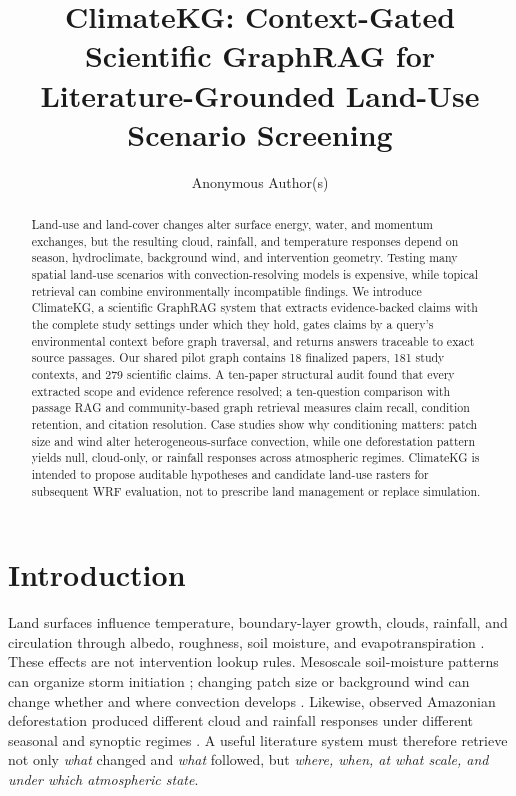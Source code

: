 \documentclass{article}
\title{ClimateKG: Context-Gated Scientific GraphRAG for\\Literature-Grounded Land-Use Scenario Screening}
\author{Anonymous Author(s)}
\newcommand{\system}{ClimateKG}
\begin{document}
\maketitle

\begin{abstract}
Land-use and land-cover changes alter surface energy, water, and momentum exchanges, but the resulting cloud, rainfall, and temperature responses depend on season, hydroclimate, background wind, and intervention geometry. Testing many spatial land-use scenarios with convection-resolving models is expensive, while topical retrieval can combine environmentally incompatible findings. We introduce \system{}, a scientific GraphRAG system that extracts evidence-backed claims with the complete study settings under which they hold, gates claims by a query's environmental context before graph traversal, and returns answers traceable to exact source passages. Our shared pilot graph contains 18 finalized papers, 181 study contexts, and 279 scientific claims. A ten-paper structural audit found that every extracted scope and evidence reference resolved; a ten-question comparison with passage RAG and community-based graph retrieval measures claim recall, condition retention, and citation resolution. Case studies show why conditioning matters: patch size and wind alter heterogeneous-surface convection, while one deforestation pattern yields null, cloud-only, or rainfall responses across atmospheric regimes. \system{} is intended to propose auditable hypotheses and candidate land-use rasters for subsequent WRF evaluation, not to prescribe land management or replace simulation.
\end{abstract}

\section{Introduction}
Land surfaces influence temperature, boundary-layer growth, clouds, rainfall, and circulation through albedo, roughness, soil moisture, and evapotranspiration \citep{pielke2007,cao2020}. These effects are not intervention lookup rules. Mesoscale soil-moisture patterns can organize storm initiation \citep{taylor2011}; changing patch size or background wind can change whether and where convection develops \citep{lee2019}. Likewise, observed Amazonian deforestation produced different cloud and rainfall responses under different seasonal and synoptic regimes \citep{wang2000}. A useful literature system must therefore retrieve not only \emph{what} changed and \emph{what} followed, but \emph{where, when, at what scale, and under which atmospheric state}.
\end{document}
